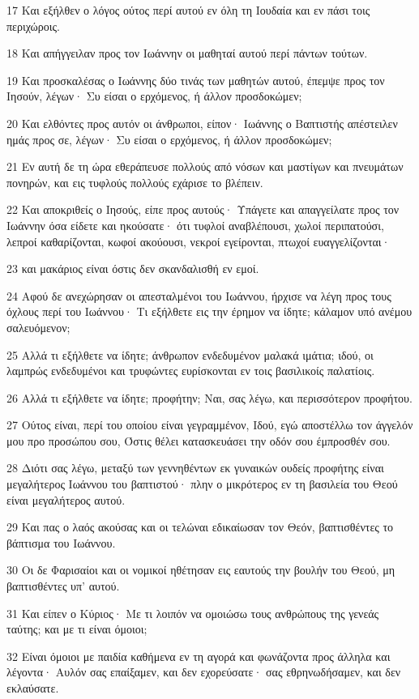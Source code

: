 \par 17 Και εξήλθεν ο λόγος ούτος περί αυτού εν όλη τη Ιουδαία και εν πάσι τοις περιχώροις.
\par 18 Και απήγγειλαν προς τον Ιωάννην οι μαθηταί αυτού περί πάντων τούτων.
\par 19 Και προσκαλέσας ο Ιωάννης δύο τινάς των μαθητών αυτού, έπεμψε προς τον Ιησούν, λέγων· Συ είσαι ο ερχόμενος, ή άλλον προσδοκώμεν;
\par 20 Και ελθόντες προς αυτόν οι άνθρωποι, είπον· Ιωάννης ο Βαπτιστής απέστειλεν ημάς προς σε, λέγων· Συ είσαι ο ερχόμενος, ή άλλον προσδοκώμεν;
\par 21 Εν αυτή δε τη ώρα εθεράπευσε πολλούς από νόσων και μαστίγων και πνευμάτων πονηρών, και εις τυφλούς πολλούς εχάρισε το βλέπειν.
\par 22 Και αποκριθείς ο Ιησούς, είπε προς αυτούς· Υπάγετε και απαγγείλατε προς τον Ιωάννην όσα είδετε και ηκούσατε· ότι τυφλοί αναβλέπουσι, χωλοί περιπατούσι, λεπροί καθαρίζονται, κωφοί ακούουσι, νεκροί εγείρονται, πτωχοί ευαγγελίζονται·
\par 23 και μακάριος είναι όστις δεν σκανδαλισθή εν εμοί.
\par 24 Αφού δε ανεχώρησαν οι απεσταλμένοι του Ιωάννου, ήρχισε να λέγη προς τους όχλους περί του Ιωάννου· Τι εξήλθετε εις την έρημον να ίδητε; κάλαμον υπό ανέμου σαλευόμενον;
\par 25 Αλλά τι εξήλθετε να ίδητε; άνθρωπον ενδεδυμένον μαλακά ιμάτια; ιδού, οι λαμπρώς ενδεδυμένοι και τρυφώντες ευρίσκονται εν τοις βασιλικοίς παλατίοις.
\par 26 Αλλά τι εξήλθετε να ίδητε; προφήτην; Ναι, σας λέγω, και περισσότερον προφήτου.
\par 27 Ούτος είναι, περί του οποίου είναι γεγραμμένον, Ιδού, εγώ αποστέλλω τον άγγελόν μου προ προσώπου σου, Όστις θέλει κατασκευάσει την οδόν σου έμπροσθέν σου.
\par 28 Διότι σας λέγω, μεταξύ των γεννηθέντων εκ γυναικών ουδείς προφήτης είναι μεγαλήτερος Ιωάννου του βαπτιστού· πλην ο μικρότερος εν τη βασιλεία του Θεού είναι μεγαλήτερος αυτού.
\par 29 Και πας ο λαός ακούσας και οι τελώναι εδικαίωσαν τον Θεόν, βαπτισθέντες το βάπτισμα του Ιωάννου.
\par 30 Οι δε Φαρισαίοι και οι νομικοί ηθέτησαν εις εαυτούς την βουλήν του Θεού, μη βαπτισθέντες υπ' αυτού.
\par 31 Και είπεν ο Κύριος· Με τι λοιπόν να ομοιώσω τους ανθρώπους της γενεάς ταύτης; και με τι είναι όμοιοι;
\par 32 Είναι όμοιοι με παιδία καθήμενα εν τη αγορά και φωνάζοντα προς άλληλα και λέγοντα· Αυλόν σας επαίξαμεν, και δεν εχορεύσατε· σας εθρηνωδήσαμεν, και δεν εκλαύσατε.
